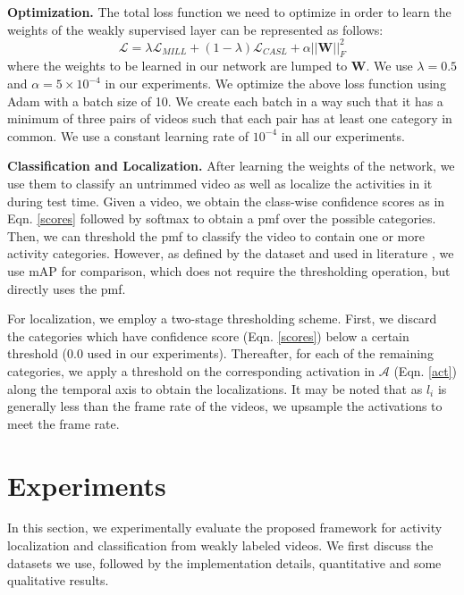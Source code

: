 \documentclass[runningheads]{llncs}
\begin{document}
\textbf{Optimization.} The total loss function we need to optimize in order to learn the weights of the weakly supervised layer can be represented as follows:
\begin{equation}
\mathcal{L} = \lambda\mathcal{L}_{MILL} + (1-\lambda)\mathcal{L}_{CASL} + \alpha  ||\boldsymbol{W}||_F^2
\label{loss}
\end{equation}
where the weights to be learned in our network are lumped to $\boldsymbol{W}$. We use $\lambda=0.5$ and $\alpha=5 \times 10^{-4}$ in our experiments. We optimize the above loss function using Adam \cite{kingma2014adam} with a batch size of 10. We create each batch in a way such that it has a minimum of three pairs of videos such that each pair has at least one category in common. We use a constant learning rate of $10^{-4}$ in all our experiments.

\textbf{Classification and Localization.} After learning the weights of the network, we use them to classify an untrimmed video as well as localize the activities in it during test time. Given a video, we obtain the class-wise confidence scores as in Eqn. \ref{scores} followed by softmax to obtain a pmf over the possible categories. Then, we can threshold the pmf to classify the video to contain one or more activity categories. However, as defined by the dataset \cite{idrees2017thumos} and used in literature \cite{wang2017untrimmednets}, we use mAP for comparison, which does not require the thresholding operation, but directly uses the pmf. 

For localization, we employ a two-stage thresholding scheme. First, we discard the categories which have confidence score (Eqn. \ref{scores}) below a certain threshold (0.0 used in our experiments). Thereafter, for each of the remaining categories, we apply a threshold on the corresponding activation in $\boldsymbol{\mathcal{A}}$ (Eqn. \ref{act}) along the temporal axis to obtain the localizations. It may be noted that as $l_i$ is generally less than the frame rate of the videos, we upsample the activations to meet the frame rate. 

\section{Experiments}
\label{exp}
In this section, we experimentally evaluate the proposed framework for activity localization and classification from weakly labeled videos. We first discuss the datasets we use, followed by the implementation details, quantitative and some qualitative results.
\end{document}
